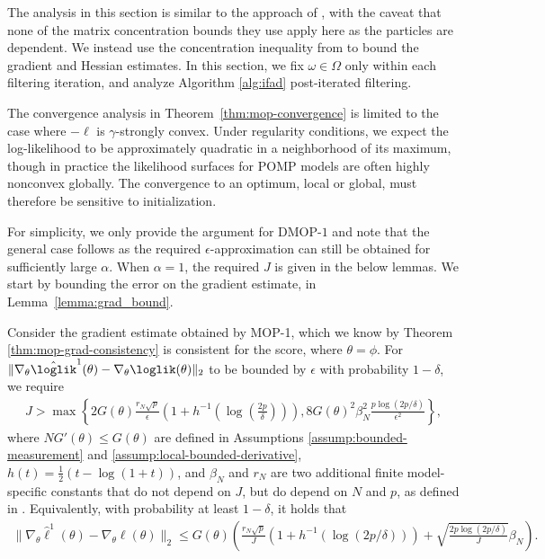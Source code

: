 


The analysis in this section is similar to the approach of \cite{mahoney16}, with the caveat that none of the matrix concentration bounds they use apply here as the particles are dependent.
We instead use the concentration inequality from \cite{delMoral11} to bound the gradient and Hessian estimates.
In this section, we fix $\omega \in \Omega$ only within each filtering iteration, and analyze Algorithm \ref{alg:ifad} post-iterated filtering.

The convergence analysis in Theorem~\ref{thm:mop-convergence} is limited to the case where $-\ell$ is $\gamma$-strongly convex. Under regularity conditions, we expect the log-likelihood to be approximately quadratic in a neighborhood of its maximum, though in practice the likelihood surfaces for POMP models are often highly nonconvex globally. The convergence to an optimum, local or global, must therefore be sensitive to initialization.  

For simplicity, we only provide the argument for DMOP-$1$ and note that the general case follows as the required $\epsilon$-approximation can still be obtained for sufficiently large $\alpha$. 
When $\alpha=1$, the required $J$ is given in the below lemmas. 
We start by bounding the error on the gradient estimate, in Lemma~\ref{lemma:grad_bound}.


\begin{lem}
    \label{lemma:grad_bound}
    Consider the gradient estimate obtained by MOP-1, which we know by Theorem \ref{thm:mop-grad-consistency} is consistent for the score, where $\theta = \phi$. For $\|\nabla_\theta \hat{\loglik}^1(\theta) - \nabla_\theta \loglik(\theta)\|_2$ to be bounded by $\epsilon$ with probability $1-\delta$, we require
    \begin{align}
    J > \max\left\{2G(\theta)\frac{r_N\sqrt{p}}{\epsilon}\left(1+h^{-1}\left(\log\left(\frac{2p}{\delta}\right)\right)\right), 8G(\theta)^2\beta_N^2\frac{p\log(2p/\delta)}{\epsilon^2}\right\},
    \end{align}
    where $NG'(\theta) \leq G(\theta)$ are defined in Assumptions \ref{assump:bounded-measurement} and \ref{assump:local-bounded-derivative}, $h(t) = \frac{1}{2}(t - \log(1+t))$, and $\beta_N$ and $r_N$ are two additional finite model-specific constants that do not depend on $J$, but do depend on $N$ and $p$, as defined in \cite{delMoral11}. 
Equivalently, with probability at least $1-\delta$, it holds that
    \begin{align}
        \|\nabla_\theta \hat\ell^1(\theta) - \nabla_\theta \ell(\theta)\|_2 \leq G(\theta)\left(\frac{r_N\sqrt{p}}{J}(1+h^{-1}(\log(2p/\delta))) + \sqrt{\frac{2p\log(2p/\delta)}{J}}\beta_N\right).
    \end{align}
\end{lem}

